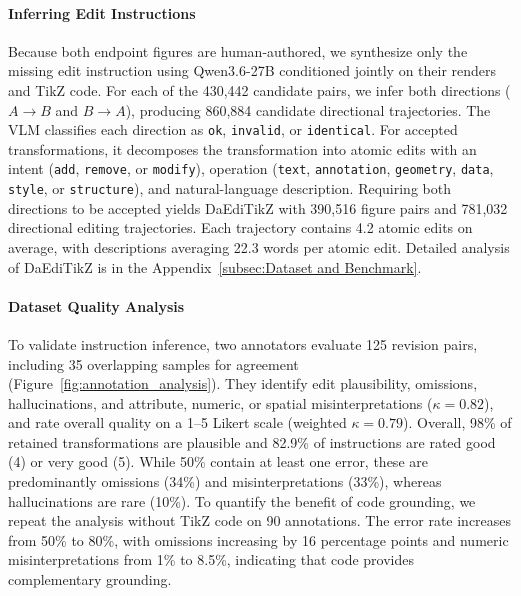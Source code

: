 

\paragraph{Inferring Edit Instructions}
Because both endpoint figures are human-authored, we synthesize only the missing edit instruction using Qwen3.6-27B conditioned jointly on their renders and TikZ code. For each of the 430,442 candidate pairs, we infer both directions ($A\!\rightarrow\!B$ and $B\!\rightarrow\!A$), producing 860,884 candidate directional trajectories. The VLM classifies each direction as \texttt{ok}, \texttt{invalid}, or \texttt{identical}. For accepted transformations, it decomposes the transformation into atomic edits with an intent (\texttt{add}, \texttt{remove}, or \texttt{modify}), operation (\texttt{text}, \texttt{annotation}, \texttt{geometry}, \texttt{data}, \texttt{style}, or \texttt{structure}), and natural-language description. Requiring both directions to be accepted yields DaEdiTikZ with 390,516 figure pairs and 781,032 directional editing trajectories. Each trajectory contains 4.2 atomic edits on average, with descriptions averaging 22.3 words per atomic edit. Detailed analysis of DaEdiTikZ is in the Appendix~\ref{subsec:Dataset and Benchmark}.



\paragraph{Dataset Quality Analysis}
To validate instruction inference, two annotators evaluate 125 revision pairs, including 35 overlapping samples for agreement (Figure~\ref{fig:annotation_analysis}). They identify edit plausibility, omissions, hallucinations, and attribute, numeric, or spatial misinterpretations ($\kappa=0.82$), and rate overall quality on a 1--5 Likert scale (weighted $\kappa=0.79$). Overall, 98\% of retained transformations are plausible and 82.9\% of instructions are rated good (4) or very good (5). While 50\% contain at least one error, these are predominantly omissions (34\%) and misinterpretations (33\%), whereas hallucinations are rare (10\%). To quantify the benefit of code grounding, we repeat the analysis without TikZ code on 90 annotations. The error rate increases from 50\% to 80\%, with omissions increasing by 16 percentage points and numeric misinterpretations from 1\% to 8.5\%, indicating that code provides complementary grounding.

